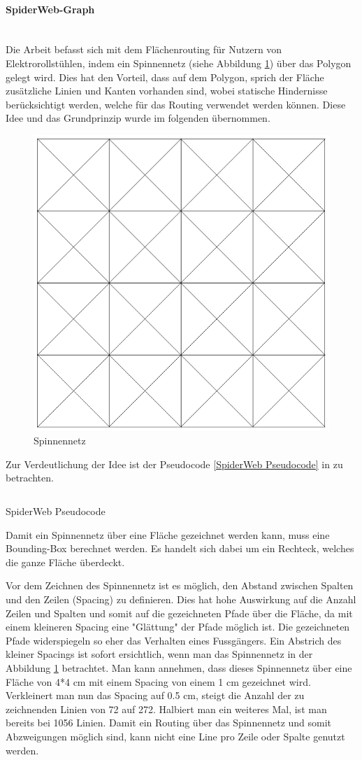 \paragraph{SpiderWeb-Graph}\label{solution:SpiderWeb-Graph}~\\


Die Arbeit \cite{dzafic_spider_web_graph} befasst sich mit dem Flächenrouting für Nutzern von Elektrorollstühlen, indem ein Spinnennetz (siehe Abbildung \ref{fig:spiderweb}) über das Polygon gelegt wird. Dies hat den Vorteil, dass auf dem Polygon, sprich der Fläche zusätzliche Linien und Kanten vorhanden sind, wobei statische Hindernisse berücksichtigt werden, welche für das Routing verwendet werden können. Diese Idee und das Grundprinzip wurde im folgenden übernommen.

\begin{figure}[ht]
\centering
\includegraphics[width=0.5\linewidth]{technicalreport/img/spiderweb}
\caption[Spinnennetz]{Spinnennetz}
\label{fig:spiderweb}
\end{figure}

Zur Verdeutlichung der Idee ist der Pseudocode \ref{SpiderWeb Pseudocode} in zu betrachten.

\begin{listing}[ht]
    \inputminted{python}{technicalreport/listing/spiderweb_pseudocode.py}
    \caption{SpiderWeb Pseudocode}
    \label{SpiderWeb Pseudocode}
\end{listing}

Damit ein Spinnennetz über eine Fläche gezeichnet werden kann, muss eine Bounding-Box berechnet werden. Es handelt sich dabei um ein Rechteck, welches die ganze Fläche überdeckt. 

Vor dem Zeichnen des Spinnennetz ist es möglich, den Abstand zwischen Spalten und den Zeilen (Spacing) zu definieren. Dies hat hohe Auswirkung auf die Anzahl Zeilen und Spalten und somit auf die gezeichneten Pfade über die Fläche, da mit einem kleineren Spacing eine "Glättung" der Pfade möglich ist. Die gezeichneten Pfade widerspiegeln so eher das Verhalten eines Fussgängers. Ein Abstrich des kleiner Spacings ist sofort ersichtlich, wenn man das Spinnennetz in der Abbildung \ref{fig:spiderweb} betrachtet. Man kann annehmen, dass dieses Spinnennetz über eine Fläche von 4*4 cm mit einem Spacing von einem 1 cm gezeichnet wird. Verkleinert man nun das Spacing auf 0.5 cm, steigt die Anzahl der zu zeichnenden Linien von 72 auf 272. Halbiert man ein weiteres Mal, ist man bereits bei 1056 Linien. Damit ein Routing über das Spinnennetz und somit Abzweigungen möglich sind, kann nicht eine Line pro Zeile oder Spalte genutzt werden.

